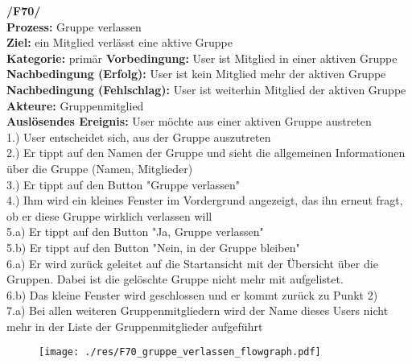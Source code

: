 \textbf{/F70/}\\
\textbf{Prozess:} Gruppe verlassen\\
\textbf{Ziel:} ein Mitglied verlässt eine aktive Gruppe\\
\textbf{Kategorie:} primär
\textbf{Vorbedingung:} User ist Mitglied in einer aktiven Gruppe
\textbf{Nachbedingung (Erfolg):} User ist kein Mitglied mehr der aktiven Gruppe\\
\textbf{Nachbedingung (Fehlschlag):} User ist weiterhin Mitglied der aktiven Gruppe\\
\textbf{Akteure:} Gruppenmitglied\\
\textbf{Auslösendes Ereignis:} User möchte aus einer aktiven Gruppe austreten\\
1.) User entscheidet sich, aus der Gruppe auszutreten\\
2.) Er tippt auf den Namen der Gruppe und sieht die allgemeinen Informationen über die Gruppe (Namen, Mitglieder)\\
3.) Er tippt auf den Button "Gruppe verlassen"\\
4.) Ihm wird ein kleines Fenster im Vordergrund angezeigt, das ihn erneut fragt, ob er diese Gruppe wirklich verlassen will\\
5.a) Er tippt auf den Button "Ja, Gruppe verlassen"\\
5.b) Er tippt auf den Button "Nein, in der Gruppe bleiben"\\
6.a) Er wird zurück geleitet auf die Startansicht mit der Übersicht über die Gruppen. Dabei ist die gelöschte Gruppe nicht mehr mit aufgelistet.\\
6.b) Das kleine Fenster wird geschlossen und er kommt zurück zu Punkt 2)\\
7.a) Bei allen weiteren Gruppenmitgliedern wird der Name dieses Users nicht mehr in der Liste der Gruppenmitglieder aufgeführt\\

\begin{figure} [H]
	\centering
	\texttt{[image: ./res/F70\_gruppe\_verlassen\_flowgraph.pdf]}
\end{figure}

